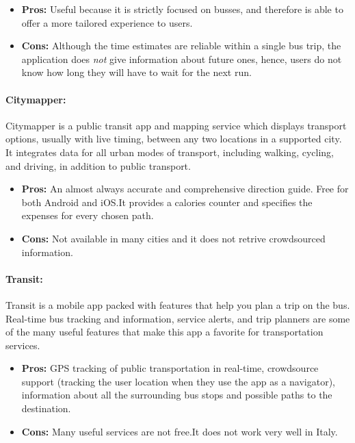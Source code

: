 \documentclass[a4paper, 11pt]{report}
\begin{document}
\begin{itemize}
	\item \textbf{Pros:} Useful because it is strictly focused on busses, and therefore is able to offer a more tailored experience to users.
	\item \textbf{Cons:} Although the time estimates are reliable within a single bus trip, the application does \emph{not} give information about future ones, hence, users do not know how long they will have to wait for the next run.
\end{itemize}

\paragraph{Citymapper:} Citymapper is a public transit app and mapping service which displays transport options, usually with live timing, between any two locations in a supported city. It integrates data for all urban modes of transport, including walking, cycling, and driving, in addition to public transport.

\begin{itemize}
	\item \textbf{Pros:} An almost always accurate and comprehensive direction guide. Free for both Android and iOS.\@ It provides a calories counter and 	specifies the expenses for every chosen path.
	\item \textbf{Cons:} Not available in many cities and it does not retrive crowdsourced information.
\end{itemize}

\paragraph{Transit:}  Transit is a mobile app packed with features that help you plan a trip on the bus. Real-time bus tracking and information, service alerts, and trip planners are some of the many useful features that make this app a favorite for transportation services.

\begin{itemize}
	\item \textbf{Pros:} GPS tracking of public transportation in real-time, crowdsource support (tracking the user location when they use the app as a navigator), information about all the surrounding bus stops and possible paths to the destination.
	\item \textbf{Cons:} Many useful services are not free.\@ It does not work very well in Italy.
\end{itemize}
\end{document}
